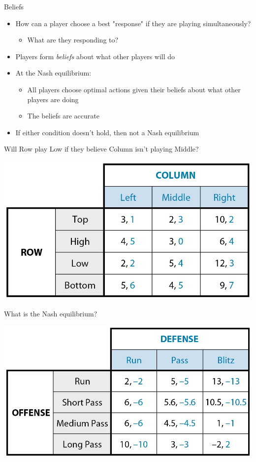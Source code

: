 \documentclass[10pt]{beamer}
\begin{document}
\begin{frame}[label={sec:orgc1c5e8a}]{}
\alert{Beliefs}
\begin{itemize}
\item How can a player choose a best "response" if they are playing simultaneously?
\begin{itemize}
\item What are they responding to?
\end{itemize}
\item Players form \emph{beliefs} about what other players will do
\item At the Nash equilibrium:
\begin{itemize}
\item All players choose optimal actions given their beliefs about what other players are doing
\item The beliefs are accurate
\end{itemize}
\item If either condition doesn't hold, then not a Nash equilibrium
\end{itemize}
\end{frame}

\begin{frame}[label={sec:org3619743}]{Will Row play Low if they believe Column isn't playing Middle?}
\begin{center}
\includegraphics[width=.75\textwidth]{./img/GAMES4_FIG04.01.jpg}
\end{center}
\end{frame}


\begin{frame}[label={sec:orgeb34651}]{What is the Nash equilibrium?}
\begin{center}
\includegraphics[width=.75\textwidth]{./img/GAMES4_FIG04.02.jpg}
\end{center}
\end{frame}
\end{document}
